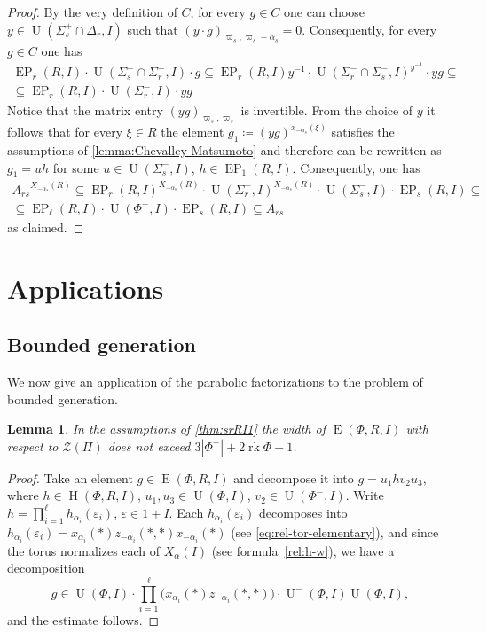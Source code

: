 \documentclass[oneside, 12pt]{amsart}
\theoremstyle{plain}
\numberwithin{equation}{section}
\newtheorem{lemma}{Lemma}
\numberwithin{lemma}{section}
\theoremstyle{definition}
\theoremstyle{remark}
\DeclareMathOperator{\E}{E}
\DeclareMathOperator{\EP}{EP}
\DeclareMathOperator{\Hh}{H}
\DeclareMathOperator{\U}{U}
\DeclareMathOperator{\rk}{rk}
\begin{document}
\begin{proof}
By the very definition of $C$, for every $g \in C$ one can choose $y \in \U(\Sigma_s^+ \cap \Delta_r, I)$ such that $(y \cdot g)_{\varpi_s, \varpi_s - \alpha_s} = 0$.
Consequently, for every $g\in C$ one has
\begin{multline*}
 \EP_r(R, I) \cdot \U(\Sigma_s^- \cap \Sigma_r^-, I) \cdot g \subseteq \EP_r(R, I) y^{-1} \cdot \U(\Sigma_r^-\cap \Sigma_s^-, I)^{y^{-1}} \cdot y g \subseteq \\
  \subseteq \EP_r(R, I) \cdot \U(\Sigma_r^-, I) \cdot y g
\end{multline*}
Notice that the matrix entry $(yg)_{\varpi_s, \varpi_s}$ is invertible.
From the choice of $y$ it follows that for every $\xi\in R$ the element $g_1 \coloneqq (yg)^{x_{-\alpha_s}(\xi)}$
satisfies the assumptions of \cref{lemma:Chevalley-Matsumoto} and therefore can be rewritten as $g_1 = uh$ for some $u \in \U(\Sigma_s^-, I)$, $h \in \EP_1(R, I)$.
Consequently, one has
\begin{multline*} {A_{rs}}^{X_{-\alpha_{s}}(R)} \subseteq \EP_r(R, I)^{X_{-\alpha_{s}}(R)} \cdot \U(\Sigma_r^-, I)^{X_{-\alpha_{s}}(R)} \cdot \U(\Sigma_s^-, I) \cdot \EP_s(R, I) \subseteq \\
 \subseteq \EP_\ell(R, I) \cdot \U(\Phi^-, I) \cdot \EP_s(R, I) \subseteq A_{rs} \end{multline*}
 as claimed.
\end{proof}

\section{Applications} \label{sec:applications}
\subsection{Bounded generation}\label{sec:boundgen}
We now give an application of the parabolic factorizations to the problem of bounded generation.
 
\begin{lemma}\label{lemma:srRI1_width}
In the assumptions of \cref{thm:srRI1} the width of $\E(\Phi,R,I)$ with respect to $\mathcal{Z}(\Pi)$ does not exceed $3\left|\Phi^+\right|+2\rk\Phi-1$.
\end{lemma}
\begin{proof}
Take an element $g\in\E(\Phi,R,I)$ and decompose it into $g=u_1 h v_2 u_3$, where $h\in\Hh(\Phi,R,I)$, $u_1,u_3\in\U(\Phi,I)$, $v_2\in\U(\Phi^-,I)$. 
Write $h=\prod_{i=1}^\ell h_{\alpha_i}(\varepsilon_i)$, $\varepsilon\in1+I$. 
Each $h_{\alpha_i}(\varepsilon_i)$ decomposes into $h_{\alpha_i}(\varepsilon_i) = x_{\alpha_i}(*) z_{-\alpha_i}(*,*) x_{-\alpha_i}(*)$ 
(see \eqref{eq:rel-tor-elementary}), and since the torus normalizes each of $X_\alpha(I)$ (see formula~\eqref{rel:h-w}), we have a decomposition
\[ g\in\U(\Phi,I)\cdot\prod_{i=1}^\ell\bigl(x_{\alpha_i}(*)z_{-\alpha_i}(*,*)\bigr)\cdot \U^-(\Phi,I) \U(\Phi,I), \]
and the estimate follows.
\end{proof}
\end{document}
